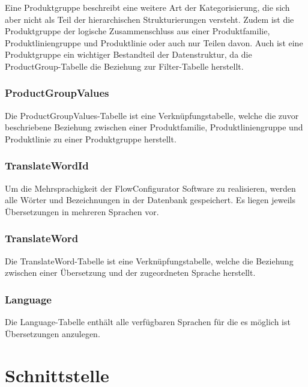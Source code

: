 Eine Produktgruppe beschreibt eine weitere Art der Kategorisierung, die sich aber nicht als Teil der hierarchischen Strukturierungen versteht. Zudem ist die Produktgruppe der logische Zusammenschluss aus einer Produktfamilie, Produktliniengruppe und Produktlinie oder auch nur Teilen davon. Auch ist eine Produktgruppe ein wichtiger Bestandteil der Datenstruktur, da die ProductGroup-Tabelle die Beziehung zur Filter-Tabelle herstellt.

\subsubsection{ProductGroupValues}

Die ProductGroupValues-Tabelle ist eine Verknüpfungstabelle, welche die zuvor beschriebene Beziehung zwischen einer Produktfamilie, Produktliniengruppe und Produktlinie zu einer Produktgruppe herstellt.

\subsubsection{TranslateWordId}

Um die Mehrsprachigkeit der FlowConfigurator Software zu realisieren, werden alle Wörter und Bezeichnungen in der Datenbank gespeichert. Es liegen jeweils Übersetzungen in mehreren Sprachen vor.

\subsubsection{TranslateWord}

Die TranslateWord-Tabelle ist eine Verknüpfungstabelle, welche die Beziehung zwischen einer Übersetzung und der zugeordneten Sprache herstellt.

\subsubsection{Language}

Die Language-Tabelle enthält alle verfügbaren Sprachen für die es möglich ist Übersetzungen anzulegen.

\section{Schnittstelle}
\label{sec:Entwurf:Schnittstelle}

